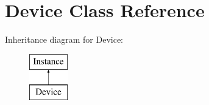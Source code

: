 \hypertarget{class_open_chams_1_1_device}{\section{Device Class Reference}
\label{class_open_chams_1_1_device}
}
Inheritance diagram for Device\-:\begin{figure}[H]
\begin{center}
\leavevmode
\includegraphics[height=2.000000cm]{class_open_chams_1_1_device}
\end{center}
\end{figure}
